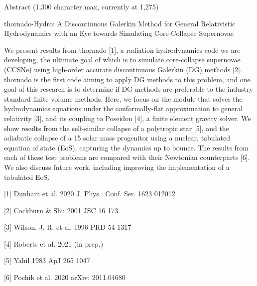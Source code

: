 \documentclass{article}
\begin{document}
\begin{center}
Abstract (1,300 character max, currently at 1,275)
\end{center}

\begin{center}
thornado-Hydro: A Discontinuous Galerkin Method for General Relativistic Hydrodynamics with an Eye towards Simulating Core-Collapse Supernovae
\end{center}

We present results from thornado [1], a radiation-hydrodynamics code we are developing, the ultimate goal of which is to simulate core-collapse supernovae (CCSNe) using high-order accurate discontinuous Galerkin (DG) methods [2]. thornado is the first code aiming to apply DG methods to this problem, and one goal of this research is to determine if DG methods are preferable to the industry standard finite volume methods. Here, we focus on the module that solves the hydrodynamics equations under the conformally-flat approximation to general relativity [3], and its coupling to Poseidon [4], a finite element gravity solver. We show results from the self-similar collapse of a polytropic star [5], and the adiabatic collapse of a 15 solar mass progenitor using a nuclear, tabulated equation of state (EoS), capturing the dynamics up to bounce. The results from each of these test problems are compared with their Newtonian counterparts [6]. We also discuss future work, including improving the implementation of a tabulated EoS.

[1] Dunham et al. 2020 J. Phys.: Conf. Ser. 1623 012012

[2] Cockburn \& Shu 2001 JSC 16 173

[3] Wilson, J. R. et al. 1996 PRD 54 1317

[4] Roberts et al. 2021 (in prep.)

[5] Yahil 1983 ApJ 265 1047

[6] Pochik et al. 2020 arXiv: 2011.04680
\end{document}
